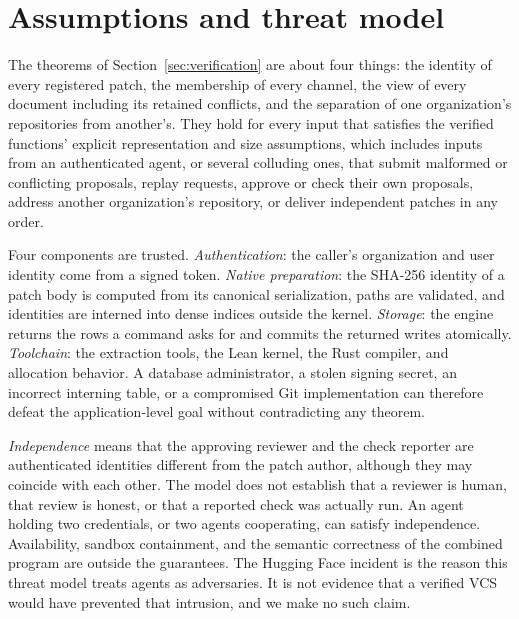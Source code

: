 \section{Assumptions and threat model}\label{sec:threat}
The theorems of Section~\ref{sec:verification} are about four things: the identity of every registered patch, the membership of every channel, the view of every document including its retained conflicts, and the separation of one organization's repositories from another's. They hold for every input that satisfies the verified functions' explicit representation and size assumptions, which includes inputs from an authenticated agent, or several colluding ones, that submit malformed or conflicting proposals, replay requests, approve or check their own proposals, address another organization's repository, or deliver independent patches in any order.

Four components are trusted. \emph{Authentication}: the caller's organization and user identity come from a signed token. \emph{Native preparation}: the SHA-256 identity of a patch body is computed from its canonical serialization, paths are validated, and identities are interned into dense indices outside the kernel. \emph{Storage}: the engine returns the rows a command asks for and commits the returned writes atomically. \emph{Toolchain}: the extraction tools, the Lean kernel, the Rust compiler, and allocation behavior. A database administrator, a stolen signing secret, an incorrect interning table, or a compromised Git implementation can therefore defeat the application-level goal without contradicting any theorem.

\emph{Independence} means that the approving reviewer and the check reporter are authenticated identities different from the patch author, although they may coincide with each other. The model does not establish that a reviewer is human, that review is honest, or that a reported check was actually run. An agent holding two credentials, or two agents cooperating, can satisfy independence. Availability, sandbox containment, and the semantic correctness of the combined program are outside the guarantees. The Hugging Face incident is the reason this threat model treats agents as adversaries. It is not evidence that a verified VCS would have prevented that intrusion, and we make no such claim.

